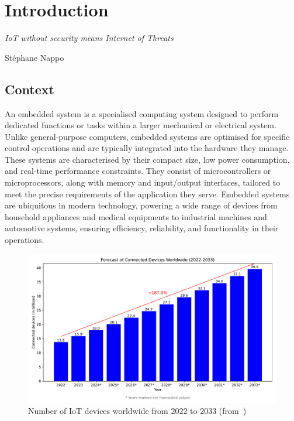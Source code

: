 \chapter{Introduction}
\label{chapter:introduction}

\epigraph{\textit{IoT without security means Internet of Threats}}{Stéphane Nappo}

\minitoc

\section{Context}
An embedded system is a specialised computing system designed to perform dedicated functions or tasks within a larger mechanical or electrical system. Unlike general-purpose computers, embedded systems are optimised for specific control operations and are typically integrated into the hardware they manage. These systems are characterised by their compact size, low power consumption, and real-time performance constraints. They consist of microcontrollers or microprocessors, along with memory and input/output interfaces, tailored to meet the precise requirements of the application they serve. Embedded systems are ubiquitous in modern technology, powering a wide range of devices from household appliances and medical equipments to industrial machines and automotive systems, ensuring efficiency, reliability, and functionality in their operations.

\begin{figure}[ht]
    \centering
    \includegraphics[width=\textwidth]{c1_intro/img/iot_forecasts.pdf}
    \caption{Number of IoT devices worldwide from 2022 to 2033 (from~\cite{statista_iot})}
    \label{fig:iot_forecasts}
\end{figure}

